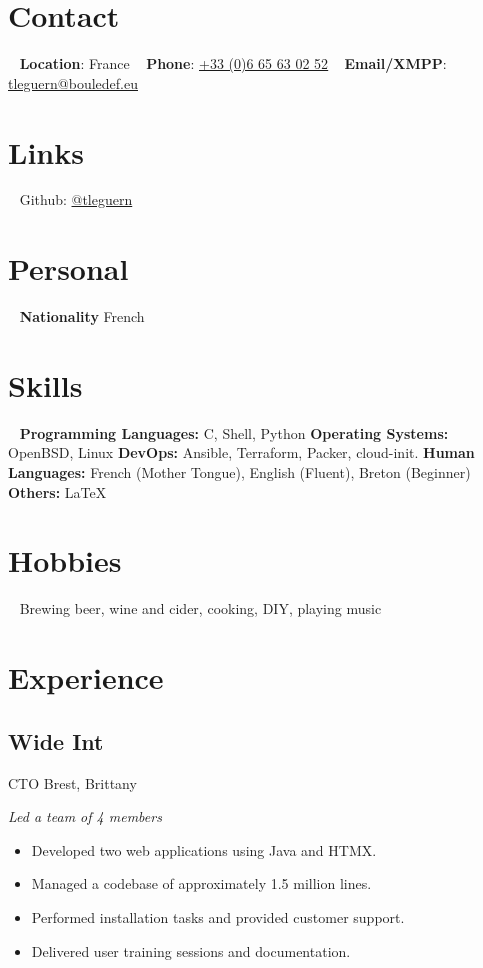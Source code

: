 \documentclass[hidelinks]{friggeri-cv} %
\begin{document}


\begin{aside} %
\section{Contact}
~
\textbf{Location}: France
~
\textbf{Phone}: \href{tel:0033665630252}{\underline{+33 (0)6 65 63 02 52}}
~
\textbf{Email/XMPP}: \href{mailto:tleguern@bouledef.eu}{\underline{tleguern@bouledef.eu}}
\section {Links}
~
Github: \href{https://github.com/tleguern}{@tleguern}
\section{Personal}
~
\textbf{Nationality}
French
\section{Skills}
~
\textbf{Programming Languages:} C, Shell, Python
\textbf{Operating Systems:} OpenBSD, Linux
\textbf{DevOps:} Ansible, Terraform, Packer, cloud-init.
\textbf{Human Languages:} French (Mother Tongue), English (Fluent), Breton (Beginner)
\textbf{Others:} \LaTeX
\section{Hobbies}
~
Brewing beer, wine and cider, cooking, DIY, playing music
\end{aside}


\section{Experience}

\subsection{Wide Int}
\begin{entrylist}
 {CTO} {Brest, Brittany} {
  \emph{Led a team of 4 members}
  \begin{itemize}
    \item Developed two web applications using Java and HTMX.
    \item Managed a codebase of approximately 1.5 million lines.
    \item Performed installation tasks and provided customer support.
    \item Delivered user training sessions and documentation.
  \end{itemize}
}
\end{entrylist}
\end{document}
